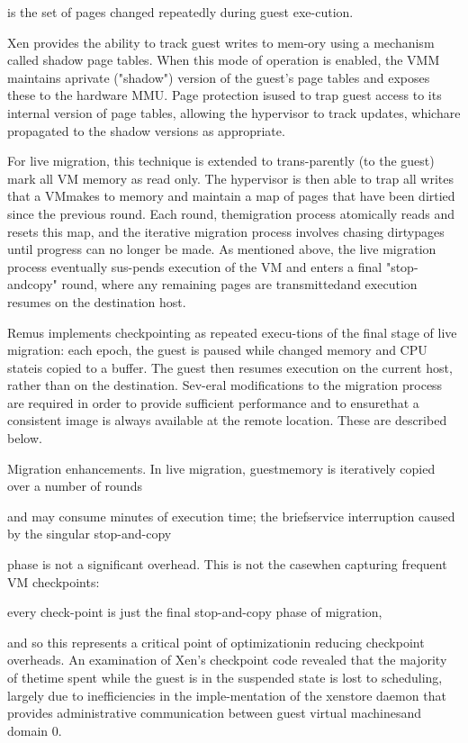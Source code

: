 is the set of pages changed repeatedly during guest exe-cution.

Xen provides the ability to track guest writes to mem-ory using a mechanism called shadow page tables. When
this mode of operation is enabled, the VMM maintains aprivate ("shadow") version of the guest's page tables and
exposes these to the hardware MMU. Page protection isused to trap guest access to its internal version of page
tables, allowing the hypervisor to track updates, whichare propagated to the shadow versions as appropriate.

For live migration, this technique is extended to trans-parently (to the guest) mark all VM memory as read only.
The hypervisor is then able to trap all writes that a VMmakes to memory and maintain a map of pages that have
been dirtied since the previous round. Each round, themigration process atomically reads and resets this map,
and the iterative migration process involves chasing dirtypages until progress can no longer be made. As mentioned above, the live migration process eventually sus-pends execution of the VM and enters a final "stop-andcopy" round, where any remaining pages are transmittedand execution resumes on the destination host.

Remus implements checkpointing as repeated execu-tions of the final stage of live migration: each epoch, the
guest is paused while changed memory and CPU stateis copied to a buffer. The guest then resumes execution
on the current host, rather than on the destination. Sev-eral modifications to the migration process are required
in order to provide sufficient performance and to ensurethat a consistent image is always available at the remote
location. These are described below.

Migration enhancements. In live migration, guestmemory is iteratively copied over a number of rounds

and may consume minutes of execution time; the briefservice interruption caused by the singular stop-and-copy

phase is not a significant overhead. This is not the casewhen capturing frequent VM checkpoints:

every check-point is just the final stop-and-copy phase of migration,

and so this represents a critical point of optimizationin reducing checkpoint overheads. An examination of
Xen's checkpoint code revealed that the majority of thetime spent while the guest is in the suspended state is lost
to scheduling, largely due to inefficiencies in the imple-mentation of the xenstore daemon that provides administrative communication between guest virtual machinesand domain 0.

